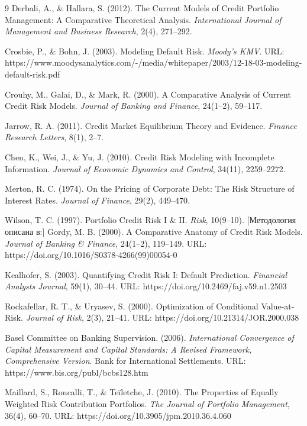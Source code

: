 \documentclass[]{article}
\begin{document}
	\newpage
	\begin{thebibliography}{9}
		Derbali, A., \& Hallara, S. (2012). The Current Models of Credit Portfolio Management: A Comparative Theoretical Analysis. \textit{International Journal of Management and Business Research}, 2(4), 271–292.

		Crosbie, P., \& Bohn, J. (2003). Modeling Default Risk. \textit{Moody’s KMV}. URL: https://www.moodysanalytics.com/-/media/whitepaper/2003/12-18-03-modeling-default-risk.pdf

		Crouhy, M., Galai, D., \& Mark, R. (2000). A Comparative Analysis of Current Credit Risk Models. \textit{Journal of Banking and Finance}, 24(1–2), 59–117.

		Jarrow, R. A. (2011). Credit Market Equilibrium Theory and Evidence. \textit{Finance Research Letters}, 8(1), 2–7.

		Chen, K., Wei, J., \& Yu, J. (2010). Credit Risk Modeling with Incomplete Information. \textit{Journal of Economic Dynamics and Control}, 34(11), 2259–2272.

		Merton, R. C. (1974). On the Pricing of Corporate Debt: The Risk Structure of Interest Rates. \textit{Journal of Finance}, 29(2), 449–470.

		Wilson, T. C. (1997). Portfolio Credit Risk I \& II. \textit{Risk}, 10(9–10). [Методология описана в:] Gordy, M. B. (2000). A Comparative Anatomy of Credit Risk Models. \textit{Journal of Banking \& Finance}, 24(1–2), 119–149. URL: https://doi.org/10.1016/S0378-4266(99)00054-0

		Kealhofer, S. (2003). Quantifying Credit Risk I: Default Prediction. \textit{Financial Analysts Journal}, 59(1), 30–44. URL: https://doi.org/10.2469/faj.v59.n1.2503

		Rockafellar, R. T., \& Uryasev, S. (2000). Optimization of Conditional Value-at-Risk. \textit{Journal of Risk}, 2(3), 21–41. URL: https://doi.org/10.21314/JOR.2000.038

		Basel Committee on Banking Supervision. (2006). \textit{International Convergence of Capital Measurement and Capital Standards: A Revised Framework, Comprehensive Version}. Bank for International Settlements. URL: https://www.bis.org/publ/bcbs128.htm

		Maillard, S., Roncalli, T., \& Teïletche, J. (2010). The Properties of Equally Weighted Risk Contribution Portfolios. \textit{The Journal of Portfolio Management}, 36(4), 60–70. URL: https://doi.org/10.3905/jpm.2010.36.4.060


\end{thebibliography}
\end{document}
